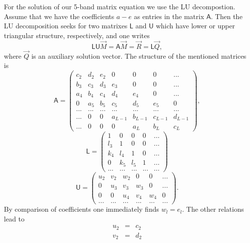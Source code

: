 \documentclass[a4paper,10pt]{article}
\begin{document}
For the solution of our 5-band matrix equation we use the LU decompostion. Assume that we have the coefficients $a-e$ as entries in the matrix $\mathsf{A}$. Then the LU decomposition seeks for two matrixes $\mathsf{L}$ and $\mathsf{U}$ which have lower or upper triangular structure, respectively, and one writes
\begin{displaymath}
 \mathsf{LU}\vec{M}=\mathsf{A}\vec{M}=\vec{R}=\mathsf{L}\vec{Q},
\end{displaymath}
where $\vec{Q}$ is an auxiliary solution vector. The structure of the mentioned matrices is
\begin{displaymath}
\mathsf{A}=\left(
\begin{matrix}
   c_2 & d_2 & e_2 & 0   & 0   & 0   & ... \\
   b_3 & c_3 & d_3 & e_3 & 0   & 0   & ... \\
   a_4 & b_4 & c_4 & d_4 & e_4 & 0   & ... \\
   0   & a_5 & b_5 & c_5 & d_5 & e_5 & 0   \\
   ... & ... & ... & ... & ... & ... & ... \\
   ... & 0   & 0   & a_{L-1} & b_{L-1} & c_{L-1} & d_{L-1}  \\
   ... & 0   & 0   &  0  & a_L & b_L & c_L 
  \end{matrix}
 \right),
\end{displaymath}
\begin{displaymath}
\mathsf{L}=\left(
\begin{matrix}
 1   & 0   & 0 & 0 & ... \\
 l_3 & 1   & 0 & 0 & ... \\
 k_4 & l_4 & 1 & 0 & ... \\
 0   & k_5 & l_5 & 1 & ...\\
 ... & ... & ...& ... & ...
\end{matrix}
\right)
\end{displaymath}
\begin{displaymath}
\mathsf{U}=\left(
\begin{matrix}
u_2 & v_2 & w_2 & 0   & 0 & ... \\
0   & u_3 & v_3 & w_3 & 0 & ... \\
0   & 0   & u_4 & v_4 & w_4 & 0 \\
... & ... & ... & ... & ... & ...
\end{matrix}
\right).
\end{displaymath}
By comparison of coefficients one immediately finds $w_l=e_l$. The other relations lead to
\begin{eqnarray*}
 u_2&=&c_2\\
 v_2&=&d_2
\end{eqnarray*}
\end{document}
